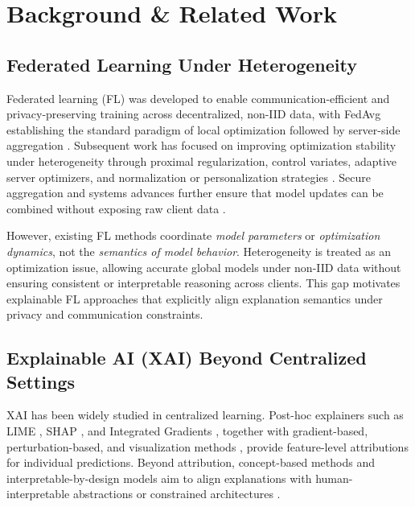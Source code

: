 \documentclass{article}
\theoremstyle{plain}
\theoremstyle{definition}
\theoremstyle{remark}
\begin{document}
\section{Background \& Related Work}
\label{sec:related}

\subsection{Federated Learning Under Heterogeneity}

Federated learning (FL) was developed to enable communication-efficient and privacy-preserving training across decentralized, non-IID data, with FedAvg establishing the standard paradigm of local optimization followed by server-side aggregation \citep{mcmahan2017communication}. Subsequent work has focused on improving optimization stability under heterogeneity through proximal regularization, control variates, adaptive server optimizers, and normalization or personalization strategies \citep{li2020federated,karimireddy2019scaffold,reddi2020adaptive,li2021fedbn,smith2017federated}. Secure aggregation and systems advances further ensure that model updates can be combined without exposing raw client data \citep{bonawitz2019towards}.

However, existing FL methods coordinate \emph{model parameters} or \emph{optimization dynamics}, not the \emph{semantics of model behavior}. Heterogeneity is treated as an optimization issue, allowing accurate global models under non-IID data without ensuring consistent or interpretable reasoning across clients. This gap motivates explainable FL approaches that explicitly align explanation semantics under privacy and communication constraints.

\subsection{Explainable AI (XAI) Beyond Centralized Settings}

XAI has been widely studied in centralized learning. Post-hoc explainers such as LIME \citep{ribeiro2016should}, SHAP \citep{lundberg2017unified}, and Integrated Gradients \citep{sundararajan2017axiomatic}, together with gradient-based, perturbation-based, and visualization methods \citep{smilkov2017smoothgrad,petsiuk2018rise,shrikumar2017learning,simonyan2013deep,zeiler2014visualizing,selvaraju2017grad,fong2017interpretable}, provide feature-level attributions for individual predictions. Beyond attribution, concept-based methods and interpretable-by-design models aim to align explanations with human-interpretable abstractions or constrained architectures \citep{kim2018interpretability, alvarez2018towards, caruana2015intelligible,rudin2019stop, hooker2019benchmark, koh2020concept}.
\end{document}
